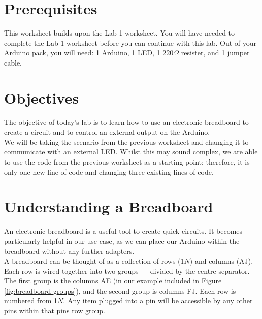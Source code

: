 \documentclass[11pt,a4paper]{article}
\begin{document}
\pagestyle{fancy}

\section*{Prerequisites}
This worksheet builds upon the Lab 1 worksheet. You will have needed to complete the Lab 1 worksheet before you can continue with this lab. Out of your Arduino pack, you will need: 1 Arduino, 1 LED, 1 $220\Omega$ resister, and 1 jumper cable.

\section*{Objectives}
The objective of today's lab is to learn how to use an electronic breadboard to create a circuit and to control an external output on the Arduino.\\

\noindent
We will be taking the scenario from the previous worksheet and changing it to communicate with an external LED. Whilst this may sound complex, we are able to use the code from the previous worksheet as a starting point; therefore, it is only one new line of code and changing three existing lines of code.

\section*{Understanding a Breadboard}
An electronic breadboard is a useful tool to create quick circuits. It becomes particularly helpful in our use case, as we can place our Arduino within the breadboard without any further adapters.\\

\noindent
A breadboard can be thought of as a collection of rows (1\textrightarrow $N$) and columns (A\textrightarrow J). Each row is wired together into two groups --- divided by the centre separator. The first group is the columns A\textrightarrow E (in our example included in Figure \ref{fig:breadboard-groups}), and the second group is columns F\textrightarrow J. Each row is numbered from 1\textrightarrow $N$. Any item plugged into a pin will be accessible by any other pins within that pins row group.\\
\end{document}
